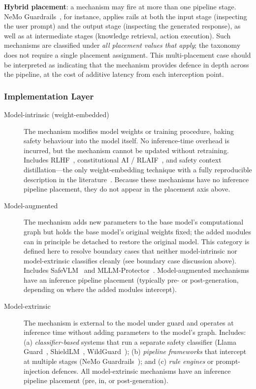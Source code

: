 \noindent\textbf{Hybrid placement}: a mechanism may fire at more than one
pipeline stage.
NeMo Guardrails~\cite{rebedea2023nemo}, for instance, applies rails at both
the input stage (inspecting the user prompt) and the output stage (inspecting the
generated response), as well as at intermediate stages (knowledge retrieval,
action execution).
Such mechanisms are classified under \emph{all placement values that apply};
the taxonomy does not require a single placement assignment.
This multi-placement case should be interpreted as indicating that the mechanism
provides defence in depth across the pipeline, at the cost of additive latency
from each interception point.

\subsubsection{Implementation Layer}

\begin{sloppypar}
\begin{description}
  \item[Model-intrinsic (weight-embedded)] The mechanism modifies model weights or
        training procedure, baking safety behaviour into the model itself.
        No inference-time overhead is incurred, but the mechanism cannot be updated
        without retraining.
        Includes RLHF~\cite{ouyang2022training}, constitutional AI /
        RLAIF~\cite{bai2022constitutional}, and safety context distillation---the
        only weight-embedding technique with a fully reproducible description in the
        literature~\cite{touvron2023llama2}.
        Because these mechanisms have no inference pipeline placement, they do not
        appear in the placement axis above.
  \item[Model-augmented] The mechanism adds new parameters to the base model's
        computational graph but holds the base model's original weights fixed;
        the added modules can in principle be detached to restore the original
        model.
        This category is defined here to resolve boundary cases that neither
        model-intrinsic nor model-extrinsic classifies cleanly (see boundary
        case discussion above).
        Includes SafeVLM~\cite{oh2024safevlm} and
        MLLM-Protector~\cite{pi2024mllm}.
        Model-augmented mechanisms have an inference pipeline placement (typically
        pre- or post-generation, depending on where the added modules intercept).
  \item[Model-extrinsic] The mechanism is external to the model under guard and
        operates at inference time without adding parameters to the model's graph.
        Includes: (a) \emph{classifier-based} systems that run a separate safety
        classifier (Llama Guard~\cite{inan2023llama}, ShieldLM~\cite{zhang2024shieldlm},
        WildGuard~\cite{han2024wildguard}); (b) \emph{pipeline frameworks} that
        intercept at multiple stages (NeMo Guardrails~\cite{rebedea2023nemo}); and
        (c) \emph{rule engines} or prompt-injection defences.
        All model-extrinsic mechanisms have an inference pipeline placement (pre,
        in, or post-generation).
\end{description}
\end{sloppypar}

